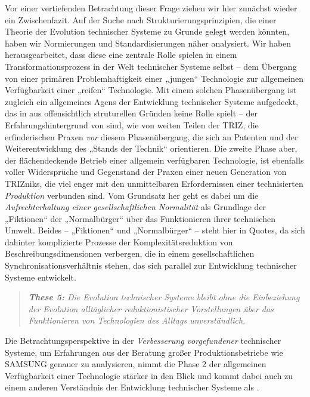 \documentclass[11pt,a4paper]{article}
\begin{document}
Vor einer vertiefenden Betrachtung dieser Frage ziehen wir hier zunächst
wieder ein Zwischenfazit.  Auf der Suche nach Strukturierungsprinzipien, die
einer Theorie der Evolution technischer Systeme zu Grunde gelegt werden
könnten, haben wir Normierungen und Standardisierungen näher analysiert. Wir
haben herausgearbeitet, dass diese eine zentrale Rolle spielen in einem
Transformationsprozess in der Welt technischer Systeme selbst -- dem Übergang
von einer primären Problemhaftigkeit einer „jungen“ Technologie zur
allgemeinen Verfügbarkeit einer „reifen“ Technologie.  Mit einem solchen
Phasenübergang ist zugleich ein allgemeines Agens der Entwicklung technischer
Systeme aufgedeckt, das in \cite{TESE2018} aus offensichtlich struturellen
Gründen keine Rolle spielt -- der Erfahrungshintergrund von \cite{TESE2018}
sind, wie von weiten Teilen der TRIZ, die erfinderischen Praxen \emph{vor}
diesem Phasenübergang, die sich an Patenten und der Weiterentwicklung des
„Stands der Technik“ orientieren.  Die zweite Phase aber, der flächendeckende
Betrieb einer allgemein verfügbaren Technologie, ist ebenfalls voller
Widersprüche und Gegenstand der Praxen einer neuen Generation von TRIZniks,
die viel enger mit den unmittelbaren Erfordernissen einer technisierten
\emph{Produktion} verbunden sind.  Vom Grundsatz her geht es dabei um die
\emph{Aufrechterhaltung einer gesellschaftlichen Normalität} als Grundlage der
„Fiktionen“ der „Normalbürger“ über das Funktionieren ihrer technischen
Umwelt.  Beides -- „Fiktionen“ und „Normalbürger“ -- steht hier in Quotes, da
sich dahinter komplizierte Prozesse der Komplexitätsreduktion von
Beschreibungsdimensionen verbergen, die in einem gesellschaftlichen
Synchronisationsverhältnis stehen, das sich parallel zur Entwicklung
technischer Systeme entwickelt.
\begin{quote}\it
  \textbf{These 5:} Die Evolution technischer Systeme bleibt ohne die
  Einbeziehung der Evolution alltäglicher reduktionistischer Vorstellungen
  über das Funktionieren von Technologien des Alltags unverständlich.   
\end{quote}

Die Betrachtungsperspektive in \cite{Shpakovsky2010} der \emph{Verbesserung
  vorgefundener} technischer Systeme, um Erfahrungen aus der Beratung großer
Produktionsbetriebe wie SAMSUNG genauer zu analysieren, nimmt die Phase 2 der
allgemeinen Verfügbarkeit einer Technologie stärker in den Blick und kommt
dabei auch zu einem anderen Verständnis der Entwicklung technischer Systeme
als \cite{TESE2018}.
\end{document}
